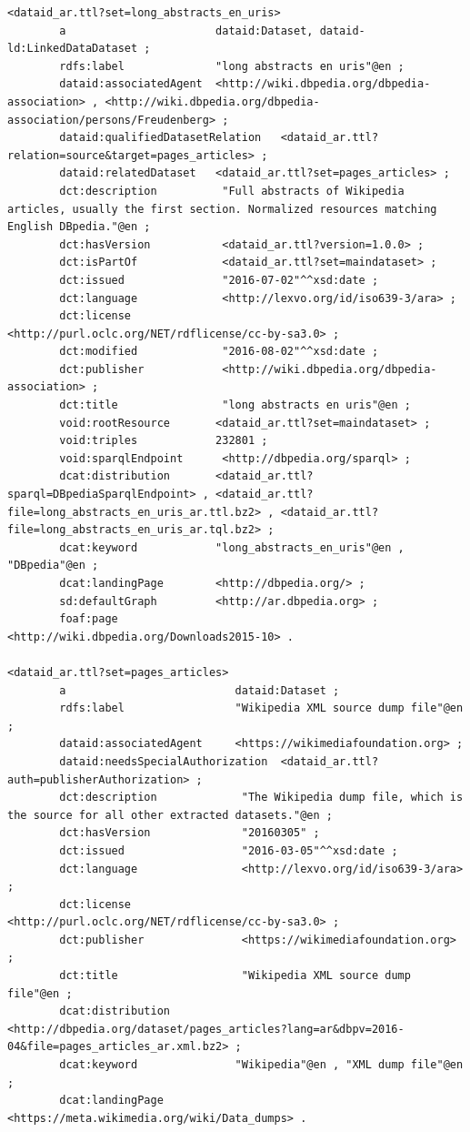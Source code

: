 \documentclass[a4paper,english,twoside,BCOR1.5cm,headsepline,DIV12,appendixprefix,final,12pt]{scrbook}
\begin{document}
\begin{lstlisting}[language=ttl, captionpos=b, label=lst:dcex,linewidth=\columnwidth,breaklines=true,basicstyle=\ttfamily\scriptsize]
<dataid_ar.ttl?set=long_abstracts_en_uris>
        a                       dataid:Dataset, dataid-ld:LinkedDataDataset ;
        rdfs:label              "long abstracts en uris"@en ;
        dataid:associatedAgent  <http://wiki.dbpedia.org/dbpedia-association> , <http://wiki.dbpedia.org/dbpedia-association/persons/Freudenberg> ;
        dataid:qualifiedDatasetRelation   <dataid_ar.ttl?relation=source&target=pages_articles> ;
        dataid:relatedDataset   <dataid_ar.ttl?set=pages_articles> ;
        dct:description          "Full abstracts of Wikipedia articles, usually the first section. Normalized resources matching English DBpedia."@en ;
        dct:hasVersion           <dataid_ar.ttl?version=1.0.0> ;
        dct:isPartOf             <dataid_ar.ttl?set=maindataset> ;
        dct:issued               "2016-07-02"^^xsd:date ;
        dct:language             <http://lexvo.org/id/iso639-3/ara> ;
        dct:license              <http://purl.oclc.org/NET/rdflicense/cc-by-sa3.0> ;
        dct:modified             "2016-08-02"^^xsd:date ;
        dct:publisher            <http://wiki.dbpedia.org/dbpedia-association> ;
        dct:title                "long abstracts en uris"@en ;
        void:rootResource       <dataid_ar.ttl?set=maindataset> ;
        void:triples            232801 ;
        void:sparqlEndpoint      <http://dbpedia.org/sparql> ;
        dcat:distribution       <dataid_ar.ttl?sparql=DBpediaSparqlEndpoint> , <dataid_ar.ttl?file=long_abstracts_en_uris_ar.ttl.bz2> , <dataid_ar.ttl?file=long_abstracts_en_uris_ar.tql.bz2> ;
        dcat:keyword            "long_abstracts_en_uris"@en , "DBpedia"@en ;
        dcat:landingPage        <http://dbpedia.org/> ;
        sd:defaultGraph         <http://ar.dbpedia.org> ;
        foaf:page               <http://wiki.dbpedia.org/Downloads2015-10> .
        
<dataid_ar.ttl?set=pages_articles>
        a                          dataid:Dataset ;
        rdfs:label                 "Wikipedia XML source dump file"@en ;
        dataid:associatedAgent     <https://wikimediafoundation.org> ;
        dataid:needsSpecialAuthorization  <dataid_ar.ttl?auth=publisherAuthorization> ;
        dct:description             "The Wikipedia dump file, which is the source for all other extracted datasets."@en ;
        dct:hasVersion              "20160305" ;
        dct:issued                  "2016-03-05"^^xsd:date ;
        dct:language                <http://lexvo.org/id/iso639-3/ara> ;
        dct:license                 <http://purl.oclc.org/NET/rdflicense/cc-by-sa3.0> ;
        dct:publisher               <https://wikimediafoundation.org> ;
        dct:title                   "Wikipedia XML source dump file"@en ;
        dcat:distribution          <http://dbpedia.org/dataset/pages_articles?lang=ar&dbpv=2016-04&file=pages_articles_ar.xml.bz2> ;
        dcat:keyword               "Wikipedia"@en , "XML dump file"@en ;
        dcat:landingPage           <https://meta.wikimedia.org/wiki/Data_dumps> .
        

\end{lstlisting}
\end{document}
